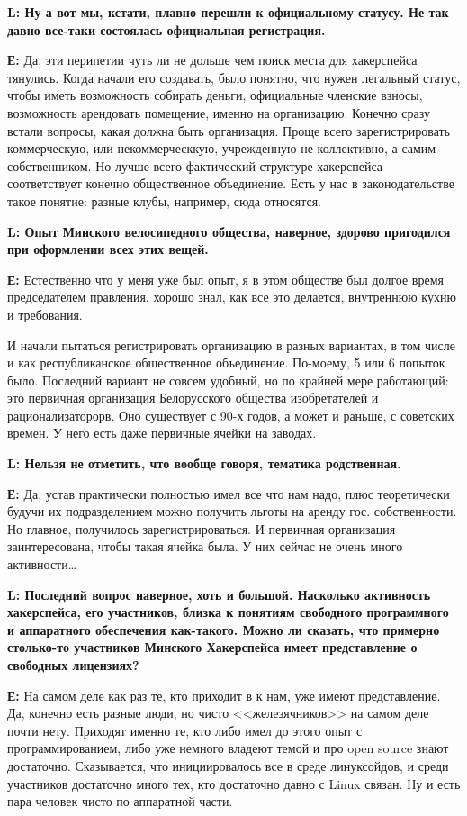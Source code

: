 \documentclass[10pt, a5paper]{article}
\begin{document}
{\noindent \bf L: Ну а вот мы, кстати, плавно перешли к официальному статусу. Не так давно все-таки состоялась официальная регистрация.}

{\noindent \bf Е:} Да, эти перипетии  чуть ли не дольше чем поиск места для хакерспейса тянулись. Когда начали его создавать, было понятно, что нужен легальный статус, чтобы иметь возможность собирать деньги, официальные членские взносы, возможность арендовать помещение, именно на организацию. Конечно сразу встали вопросы, какая должна быть организация. Проще всего зарегистрировать коммерческую, или некоммерческкую, учрежденную не коллективно, а самим собственником. Но лучше всего фактический структуре хакерспейса соответствует конечно общественное объединение. Есть у нас в законодательстве такое понятие: разные клубы, например, сюда относятся.

{\noindent \bf L: Опыт Минского велосипедного общества, наверное, здорово пригодился при оформлении всех этих вещей.}

{\noindent \bf Е:} Естественно что у меня уже был опыт, я в этом обществе был долгое время председателем правления, хорошо знал, как все это делается,  внутреннюю кухню и требования.

И начали пытаться регистрировать организацию в разных вариантах, в том числе и как республиканское общественное объединение. По-моему, 5 или 6 попыток было. Последний вариант не совсем удобный, но по крайней мере работающий: это первичная организация Белорусского общества изобретателей и рационализаторорв. Оно существует с 90-х годов, а может и раньше, с советских времен. У него есть даже первичные ячейки на заводах. 

{\noindent \bf L: Нельзя не отметить, что вообще говоря, тематика родственная.}

{\noindent \bf Е:} Да, устав практически полностью имел все что нам надо, плюс теоретически будучи их  подразделением можно получить льготы на аренду гос. собственности. Но главное, получилось зарегистрироваться. И первичная организация заинтересована, чтобы такая ячейка была. У них сейчас не очень много активности\ldots
 
{\noindent \bf L: Последний вопрос наверное, хоть и большой. Насколько активность хакерспейса, его участников, близка к понятиям свободного программного и аппаратного обеспечения как-такого. Можно ли сказать, что примерно столько-то участников Минского Хакерспейса имеет представление о свободных лицензиях?}

{\noindent \bf Е:} На самом деле как раз те, кто приходит в к нам, уже имеют представление. Да, конечно есть разные люди, но чисто <<железячников>> на самом деле почти нету. Приходят именно те, кто либо имел до этого опыт с программированием, либо уже немного владеют темой и про open source знают достаточно. Сказывается, что инициировалось все в среде линуксойдов, и среди участников достаточно много тех, кто достаточно давно с Linux связан. Ну и есть пара человек чисто по аппаратной части.
\end{document}
